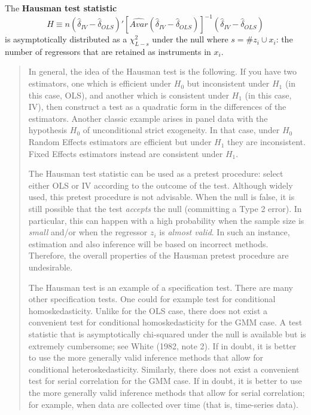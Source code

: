 \documentclass[12pt,]{book}
\begin{document}
The \textbf{Hausman test statistic}
\[
    H \equiv n (\hat{\delta} _ {IV} - \hat{\delta} _ {OLS})' [\hat{Avar} (\hat{\delta} _ {IV} - \hat{\delta} _ {OLS})]^{-1} (\hat{\delta} _ {IV} - \hat{\delta} _ {OLS})
\]
is asymptotically distributed as a \(\chi^2_{L-s}\) under the null where \(s = \# z_i \cup x_i\): the number of regressors that are retained as instruments in \(x_i\).

\begin{quote}
In general, the idea of the Hausman test is the following. If you have two estimators, one which is efficient under \(H_0\) but inconsistent under \(H_1\) (in this case, OLS), and another which is consistent under \(H_1\) (in this case, IV), then construct a test as a quadratic form in the differences of the estimators. Another classic example arises in panel data with the hypothesis \(H_0\) of unconditional strict exogeneity. In that case, under \(H_0\) Random Effects estimators are efficient but under \(H_1\) they are inconsistent. Fixed Effects estimators instead are consistent under \(H_1\).

The Hausman test statistic can be used as a pretest procedure: select either OLS or IV according to the outcome of the test. Although widely used, this pretest procedure is not advisable. When the null is false, it is still possible that the test \emph{accepts} the null (committing a Type 2 error). In particular, this can happen with a high probability when the sample size is \emph{small} and/or when the regressor \(z_i\) is \emph{almost valid}. In such an instance, estimation and also inference will be based on incorrect methods. Therefore, the overall properties of the Hausman pretest procedure are undesirable.

The Hausman test is an example of a specification test. There are many other specification tests. One could for example test for conditional homoskedasticity. Unlike for the OLS case, there does not exist a convenient test for conditional homoskedasticity for the GMM case. A test statistic that is asymptotically chi-squared under the null is available but is extremely cumbersome; see White (1982, note 2). If in doubt, it is better to use the more generally valid inference methods that allow for conditional heteroskedasticity. Similarly, there does not exist a convenient test for serial correlation for the GMM case. If in doubt, it is better to use the more generally valid inference methods that allow for serial correlation; for example, when data are collected over time (that is, time-series data).
\end{quote}
\end{document}
